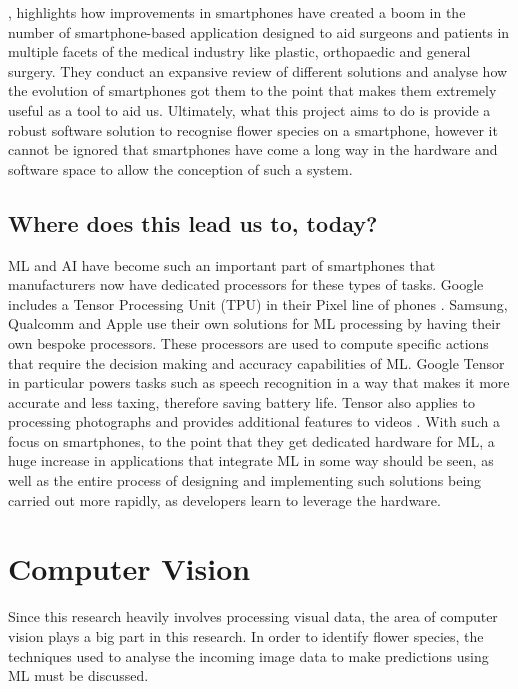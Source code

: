 \documentclass[12pt,a4paper]{report}
\begin{document}
\par

\citet{kulendran2014}, highlights how improvements in smartphones have created a boom in the number of 
smartphone-based application designed to aid surgeons and patients in multiple facets of the medical industry like 
plastic, orthopaedic and general surgery. They conduct an expansive review of different solutions and analyse how the 
evolution of smartphones got them to the point that makes them extremely useful as a tool to aid us. Ultimately, what 
this project aims to do is provide a robust software solution to recognise flower species on a smartphone, however it
cannot be ignored that smartphones have come a long way in the hardware and software space to allow the
conception of such a system.

\subsection{Where does this lead us to, today?}

ML and AI have become such an important part of smartphones that manufacturers now have dedicated processors for these
types of tasks. Google includes a Tensor Processing Unit (TPU) in their Pixel line of phones \citep{triggs2021}. Samsung, 
Qualcomm and Apple use their own solutions for ML processing by having their own bespoke processors. These 
processors are used to compute specific actions that require the decision making and accuracy capabilities of ML.
Google Tensor in particular powers tasks such as speech recognition in a way that makes it more accurate and less taxing,
therefore 
saving battery life. Tensor also applies to processing photographs and provides additional features to videos 
\citep{gupta2021}. With such a focus on smartphones, to the point that they get dedicated hardware for ML,
a huge increase in applications that integrate ML in some way should be seen, as well as the entire process of designing
and implementing such solutions being carried out more rapidly, as developers learn to leverage the hardware.

\section{Computer Vision}

Since this research heavily involves processing visual data, the area of computer vision plays a big part in this 
research. In order to identify flower species, the techniques used to analyse the incoming image data to make 
predictions using ML must be discussed.
\end{document}
